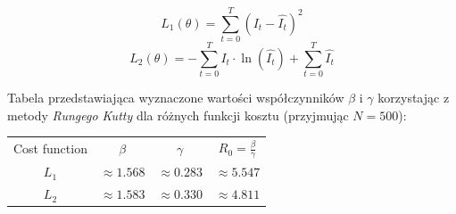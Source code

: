 \documentclass{article}
\begin{document}
$$L_1(\theta) = \sum_{t=0}^{T} (I_t - \hat{I_t})^2$$
$$L_2(\theta) = -\sum_{t=0}^{T} I_t\cdot \ln(\hat{I_t}) + 
\sum_{t=0}^{T} \hat{I_t}$$

Tabela przedstawiająca wyznaczone wartości współczynników $\beta$ i $\gamma$
korzystając z metody \textit{Rungego Kutty} dla różnych
funkcji kosztu (przyjmując $N=500$):
\begin{center}
  \begin{tabular}{c c c c} 
   Cost function & $\beta$ & $\gamma$ & $R_0 = \frac{\beta}{\gamma}$\\
   $L_1$ & $\approx1.568$ & $\approx0.283$ & $\approx5.547$\\
   $L_2$ & $\approx1.583$ & $\approx0.330$ & $\approx4.811$
  \end{tabular}
\end{center}
\end{document}
